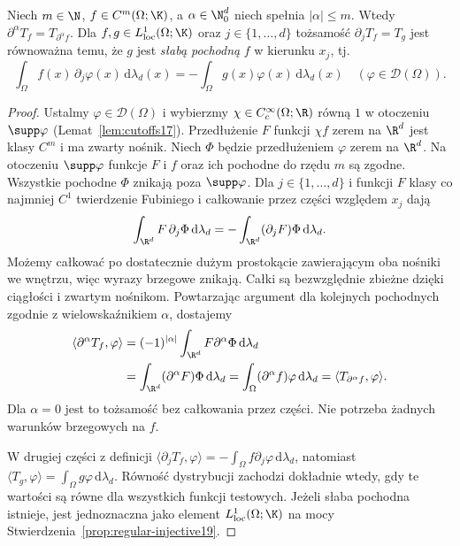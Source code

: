 \begin{stwierdzenie}
\label{prop:classical-weak20}
Niech $m\in\N$, $f\in C^m(\Omega;\K)$, a $\alpha\in\N_0^d$
niech spełnia $|\alpha|\le m$. Wtedy
$\partial^\alpha T_f=T_{\partial^\alpha f}$.
Dla $f,g\in L^1_{\mathrm{loc}}(\Omega;\K)$
oraz $j\in\{1,\ldots,d\}$ tożsamość
$\partial_jT_f=T_g$ jest równoważna temu, że $g$ jest
\emph{słabą pochodną} $f$ w kierunku $x_j$, tj.
\[
 \int_\Omega f(x)\,\partial_j\varphi(x)\,\mathrm d\lambda_d(x)
 =-\int_\Omega g(x)\varphi(x)\,\mathrm d\lambda_d(x)
 \quad(\varphi\in\mathcal D(\Omega)).
\]
\end{stwierdzenie}
\begin{proof}
Ustalmy $\varphi\in\mathcal D(\Omega)$ i wybierzmy
$\chi\in C_c^\infty(\Omega;\R)$ równą $1$ w otoczeniu
$\supp\varphi$ (Lemat~\ref{lem:cutoffs17}).
Przedłużenie $F$ funkcji $\chi f$ zerem na $\R^d$
jest klasy $C^m$ i ma zwarty nośnik. Niech $\Phi$ będzie
przedłużeniem $\varphi$ zerem na $\R^d$.
Na otoczeniu $\supp\varphi$ funkcje $F$ i $f$ oraz ich pochodne
do rzędu $m$ są zgodne. Wszystkie pochodne $\Phi$
znikają poza $\supp\varphi$.
Dla $j\in\{1,\ldots,d\}$ i funkcji $F$ klasy co najmniej $C^1$
twierdzenie Fubiniego i całkowanie przez części względem $x_j$
dają
\[
\int_{\R^d}F\,\partial_j\Phi\,\mathrm d\lambda_d
=-\int_{\R^d}(\partial_jF)\Phi\,\mathrm d\lambda_d.
\]
Możemy całkować po dostatecznie dużym prostokącie zawierającym
oba nośniki we wnętrzu, więc wyrazy brzegowe znikają.
Całki są bezwzględnie zbieżne dzięki ciągłości i zwartym nośnikom.
Powtarzając argument dla kolejnych pochodnych zgodnie z
wielowskaźnikiem $\alpha$, dostajemy
\[
\begin{aligned}
\langle\partial^\alpha T_f,\varphi\rangle
&=(-1)^{|\alpha|}\int_{\R^d}F\partial^\alpha\Phi\,\mathrm d\lambda_d\\
&=\int_{\R^d}(\partial^\alpha F)\Phi\,\mathrm d\lambda_d
=\int_\Omega(\partial^\alpha f)\varphi\,\mathrm d\lambda_d
=\langle T_{\partial^\alpha f},\varphi\rangle.
\end{aligned}
\]
Dla $\alpha=0$ jest to tożsamość bez całkowania przez części.
Nie potrzeba żadnych warunków brzegowych na $f$.

W drugiej części z definicji
$\langle\partial_jT_f,\varphi\rangle
=-\int_\Omega f\partial_j\varphi\,\mathrm d\lambda_d$,
natomiast $\langle T_g,\varphi\rangle
=\int_\Omega g\varphi\,\mathrm d\lambda_d$.
Równość dystrybucji zachodzi dokładnie wtedy, gdy te wartości
są równe dla wszystkich funkcji testowych.
Jeżeli słaba pochodna istnieje, jest jednoznaczna jako element
$L^1_{\mathrm{loc}}(\Omega;\K)$ na mocy
Stwierdzenia~\ref{prop:regular-injective19}.
\end{proof}

